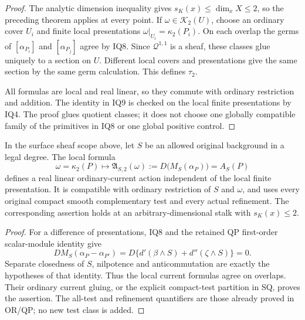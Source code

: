 \begin{proof}
The analytic dimension inequality gives
\(s_K(x)\le\dim_xX\le2\), so the preceding theorem applies
at every point.  If \(\omega\in\mathscr K_2(U)\), choose
an ordinary cover \(U_i\) and finite local presentations
\(\omega|_{U_i}=\kappa_2(P_i)\).  On each overlap the
germs of \([\alpha_{P_i}]\) and \([\alpha_{P_j}]\) agree
by IQ8.  Since \(\mathscr Q^{1,1}\) is a sheaf, these
classes glue uniquely to a section on \(U\).  Different
local covers and presentations give the same section by the
same germ calculation.  This defines \(\tau_2\).

All formulas are local and real linear, so they commute with
ordinary restriction and addition.  The identity in IQ9 is
checked on the local finite presentations by IQ4.  The proof
glues quotient classes; it does not choose one globally compatible
family of the primitives in IQ8 or one global positive control.
\end{proof}

\begin{corollary}
\label{cor:r11-intrinsic-quadratic-action-factor}
In the surface sheaf scope above, let \(S\) be an allowed
original background in a legal degree.  The local formula
\[
       \omega=\kappa_2(P)\longmapsto
       \mathfrak A_{S,2}(\omega):=D\bigl(M_S(\alpha_P)\bigr)
                                      =A_S(P)
\tag{IQ10}
\]
defines a real linear ordinary-current action independent of the
local finite presentation.  It is compatible with ordinary
restriction of \(S\) and \(\omega\), and uses every original
compact smooth complementary test and every actual refinement.
The corresponding assertion holds at an arbitrary-dimensional
stalk with \(s_K(x)\le2\).
\end{corollary}

\begin{proof}
For a difference of presentations, IQ8 and the retained QP
first-order scalar-module identity give
\[
 D M_S(\alpha_P-\alpha_{P'})
   =D\{d'(\beta\wedge S)+d''(\zeta\wedge S)\}=0.
\tag{IQ11}
\]
Separate closedness of \(S\), nilpotence and anticommutation
are exactly the hypotheses of that identity.  Thus the local
current formulas agree on overlaps.  Their ordinary current
gluing, or the explicit compact-test partition in SQ, proves
the assertion.  The all-test and refinement quantifiers are
those already proved in OR/QP; no new test class is added.
\end{proof}

